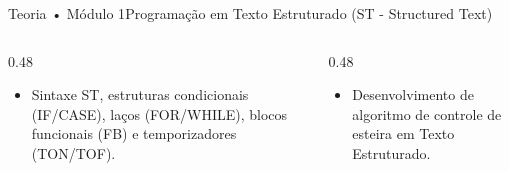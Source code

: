 \begin{senaiframe}{Teoria • Módulo 1}{Programação em Texto Estruturado (ST - Structured Text)}
  \begin{columns}[t]
    \begin{column}{0.48\textwidth}
      \begin{tcolorbox}[senaibluecard, title={Fundamentos Teóricos}]
        \begin{itemize}
          \item Sintaxe ST, estruturas condicionais (IF/CASE), laços (FOR/WHILE), blocos funcionais (FB) e temporizadores (TON/TOF).
        \end{itemize}
      \end{tcolorbox}
    \end{column}
    \begin{column}{0.48\textwidth}
      \begin{tcolorbox}[senaigreencard, title={Prática \& Laboratório}]
        \begin{itemize}
          \item Desenvolvimento de algoritmo de controle de esteira em Texto Estruturado.
        \end{itemize}
      \end{tcolorbox}
    \end{column}
  \end{columns}
\end{senaiframe}
